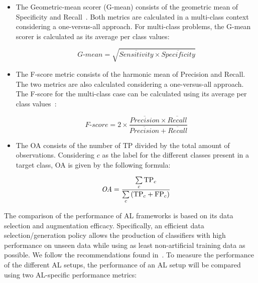 \begin{itemize}
    \item The Geometric-mean scorer (G-mean) consists of the geometric mean of
        Specificity and Recall~\cite{Kubat1997}. Both metrics are calculated
        in a multi-class context considering a one-versus-all approach. For
        multi-class problems, the G-mean scorer is calculated as its average
        per class values: 
        
        \begin{equation*}
            \textit{G-mean} = \sqrt{\overline{Sensitivity} \times
            \overline{Specificity}}
        \end{equation*}

    \item The F-score metric consists of the harmonic mean of Precision and
        Recall. The two metrics are also calculated considering a
        one-versus-all approach. The F-score for the multi-class case can be
        calculated using its average per class values~\cite{Jeni2013}:

        \begin{equation*}
            \textit{F-score}=2\times\frac{\overline{Precision} \times
            \overline{Recall}}{\overline{Precision} + \overline{Recall}}
        \end{equation*}

    \item The OA consists of the number of TP divided by the total amount of
        observations. Considering $c$ as the label for the different classes
        present in a target class, OA is given by the following formula:

        \begin{equation*}
            \textit{OA} = \frac{\sum\limits_{c}{\text{TP}_{c}}}{%
		    	      \sum\limits_{c}{(\text{TP}_{c}+\text{FP}_{c})}}
        \end{equation*}
\end{itemize}

The comparison of the performance of AL frameworks is based on its data
selection and augmentation efficacy. Specifically, an efficient data
selection/generation policy allows the production of classifiers with high
performance on unseen data while using as least non-artificial training data
as possible. We follow the recommendations found in~\cite{Kottke2017}. To
measure the performance of the different AL setups, the performance of an AL
setup will be compared using two AL-specific performance metrics:

